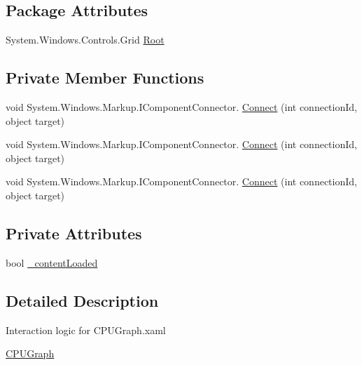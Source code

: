 \subsection*{Package Attributes}
\begin{DoxyCompactItemize}
\item 
System.\+Windows.\+Controls.\+Grid \hyperlink{class_c_p_u___o_s___simulator_1_1_controls_1_1_graphs_1_1_c_p_u_graph_af9993709cdbe673f572a3dc4562293a6}{Root}
\end{DoxyCompactItemize}
\subsection*{Private Member Functions}
\begin{DoxyCompactItemize}
\item 
void System.\+Windows.\+Markup.\+I\+Component\+Connector. \hyperlink{class_c_p_u___o_s___simulator_1_1_controls_1_1_graphs_1_1_c_p_u_graph_acf2a94868c1c80f69029616698566044}{Connect} (int connection\+Id, object target)
\item 
void System.\+Windows.\+Markup.\+I\+Component\+Connector. \hyperlink{class_c_p_u___o_s___simulator_1_1_controls_1_1_graphs_1_1_c_p_u_graph_acf2a94868c1c80f69029616698566044}{Connect} (int connection\+Id, object target)
\item 
void System.\+Windows.\+Markup.\+I\+Component\+Connector. \hyperlink{class_c_p_u___o_s___simulator_1_1_controls_1_1_graphs_1_1_c_p_u_graph_acf2a94868c1c80f69029616698566044}{Connect} (int connection\+Id, object target)
\end{DoxyCompactItemize}
\subsection*{Private Attributes}
\begin{DoxyCompactItemize}
\item 
bool \hyperlink{class_c_p_u___o_s___simulator_1_1_controls_1_1_graphs_1_1_c_p_u_graph_a0b19f662c6da5043c7bea94e5cec4de0}{\+\_\+content\+Loaded}
\end{DoxyCompactItemize}


\subsection{Detailed Description}
Interaction logic for C\+P\+U\+Graph.\+xaml 

\hyperlink{class_c_p_u___o_s___simulator_1_1_controls_1_1_graphs_1_1_c_p_u_graph}{C\+P\+U\+Graph} 

